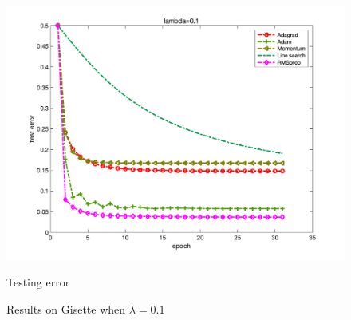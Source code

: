 \documentclass{article}
\begin{document}
\begin{figure}[H]
\begin{minipage}{0.33\linewidth}
	\includegraphics[width=1\linewidth]{./fig/err_g3}
	\caption{Testing error}
\end{minipage}
\caption*{Results on Gisette when $\lambda=0.1$}
\end{figure}
\end{document}
